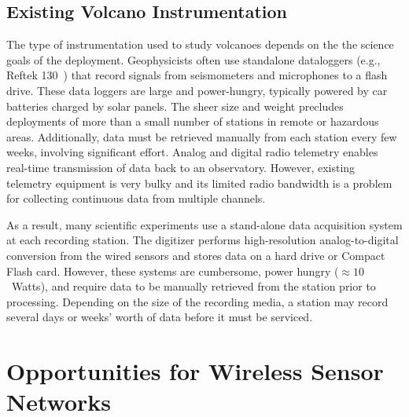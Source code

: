 \subsection{Existing Volcano Instrumentation}

The type of instrumentation used to study volcanoes depends on the the
science goals of the deployment. Geophysicists often use standalone
dataloggers (e.g., Reftek 130~\cite{reftek}) that record signals from
seismometers and microphones to a flash drive. These data loggers are large
and power-hungry, typically powered by car batteries charged by solar panels.
The sheer size and weight precludes deployments of more than a small number
of stations in remote or hazardous areas. Additionally, data must be
retrieved manually from each station every few weeks, involving significant
effort. Analog and digital radio telemetry enables real-time transmission of
data back to an observatory. However, existing telemetry equipment is very
bulky and its limited radio bandwidth is a problem for collecting continuous
data from multiple channels.

As a result, many scientific experiments use a stand-alone data acquisition
system at each recording station. The digitizer performs high-resolution
analog-to-digital conversion from the wired sensors and stores data on a hard
drive or Compact Flash card. However, these systems are cumbersome, power
hungry ($\approx 10$~Watts), and require data to be manually retrieved from
the station prior to processing. Depending on the size of the recording
media, a station may record several days or weeks' worth of data before it
must be serviced.

\section{Opportunities for Wireless Sensor Networks}

